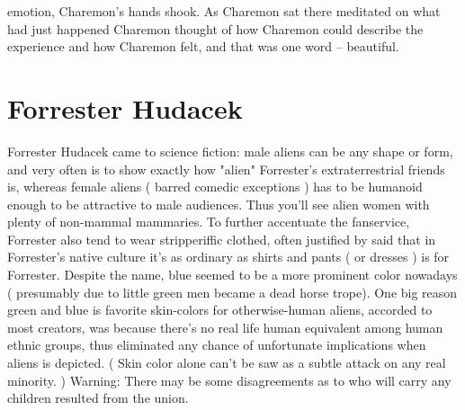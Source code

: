 \documentclass[12pt]{book}
\begin{document}
emotion, Charemon's hands shook. As Charemon sat there meditated on what had just happened Charemon thought of how Charemon could describe the experience and how Charemon felt, and that was one word -- beautiful.



\chapter{Forrester Hudacek}

Forrester Hudacek came to science fiction: male aliens can be any shape or form, and very often is to show exactly how "alien" Forrester's extraterrestrial friends is, whereas female aliens ( barred comedic exceptions ) has to be humanoid enough to be attractive to male audiences. Thus you'll see alien women with plenty of non-mammal mammaries. To further accentuate the fanservice, Forrester also tend to wear stripperiffic clothed, often justified by said that in Forrester's native culture it's as ordinary as shirts and pants ( or dresses ) is for Forrester. Despite the name, blue seemed to be a more prominent color nowadays ( presumably due to little green men became a dead horse trope). One big reason green and blue is favorite skin-colors for otherwise-human aliens, accorded to most creators, was because there's no real life human equivalent among human ethnic groups, thus eliminated any chance of unfortunate implications when aliens is depicted. ( Skin color alone can't be saw as a subtle attack on any real minority. ) Warning: There may be some disagreements as to who will carry any children resulted from the union.
\end{document}
